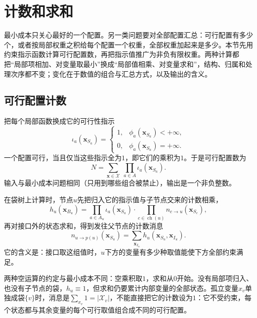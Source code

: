 
\section{计数和求和}
\label{sec:graph-dp-semiring}
\label{sec:graph-dp-counting-sums}

最小成本只关心最好的一个配置。另一类问题要对全部配置汇总：可行配置有多少个，或者按局部权重之积给每个配置一个权重，全部权重加起来是多少。本节先用约束指示函数计算可行配置数，再把指示值推广为非负有限权重。两种计算都把“局部项相加、对变量取最小”换成“局部值相乘、对变量求和”，结构、归属和处理次序都不变；变化在于数值的组合与汇总方式，以及输出的含义。

\subsection{可行配置计数}
\label{sec:graph-dp-feasible-count}

把每个局部函数换成它的可行性指示
\[
\iota_a(\bm x_{S_a})=\begin{cases}1,&\phi_a(\bm x_{S_a})<+\infty,\\0,&\phi_a(\bm x_{S_a})=+\infty.\end{cases}
\]
一个配置可行，当且仅当这些指示全为$1$，即它们的乘积为$1$。于是可行配置数为
\begin{equation}
N=\sum_{\bm x\in\mathcal X}\ \prod_{a\in A}\iota_a(\bm x_{S_a}).
\label{eq:graph-dp-feasible-count}
\end{equation}
输入与最小成本问题相同（只用到哪些组合被禁止），输出是一个非负整数。

在袋树上计算时，节点$u$先把归入它的指示值与子节点交来的计数相乘，
\begin{equation}
h_u(\bm x_{B_u})=\prod_{a\in A_u}\iota_a(\bm x_{S_a})\cdot\prod_{c\in\operatorname{ch}(u)}n_{c\to u}(\bm x_{S_c}),
\label{eq:graph-dp-count-merge}
\end{equation}
再对接口外的状态求和，得到发往父节点的计数消息
\begin{equation}
n_{u\to p(u)}(\bm x_{S_u})=\sum_{\bm x_{I_u}}h_u(\bm x_{S_u},\bm x_{I_u}).
\label{eq:graph-dp-count-message}
\end{equation}
它的含义是：接口取这组值时，$u$下方的变量有多少种取值能使下方全部约束满足。

两种空运算的约定与最小成本不同：空乘积取$1$，求和从$0$开始。没有局部项归入、也没有子节点的袋，$h_u\equiv1$，但求和仍要累计内部变量的全部状态。孤立变量$x_v$单独成袋$\{v\}$时，消息是$\sum_{x_v}1=|\mathcal X_v|$，不能直接把它的计数设为$1$：它不受约束，每个状态都与其余变量的每个可行取值组合成不同的可行配置。


